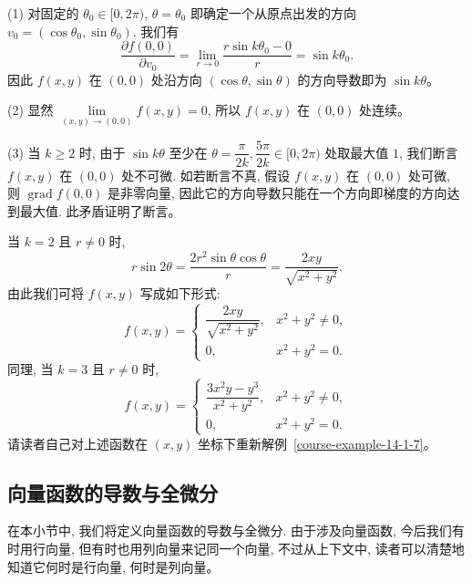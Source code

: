 \documentclass[12pt,fontset=fandol]{ctexart}
\begin{document}
\begin{solve}\quad (1) 对固定的 $\theta_0\in[0,2\pi)$, $\theta=\theta_0$ 即确定一个从原点出发的方向 $v_0=(\cos\theta_0,\sin\theta_0)$. 我们有
\[
  \frac{\partial f(0,0)}{\partial v_0}
  =\lim_{r\to0}\frac{r\sin k\theta_0-0}{r}
  =\sin k\theta_0.
\]
因此 $f(x,y)$ 在 $(0,0)$ 处沿方向 $(\cos\theta,\sin\theta)$ 的方向导数即为 $\sin k\theta$。

(2) 显然 $\lim\limits_{(x,y)\to(0,0)}f(x,y)=0$, 所以 $f(x,y)$ 在 $(0,0)$ 处连续。

(3) 当 $k\geqslant2$ 时, 由于 $\sin k\theta$ 至少在 $\theta=\dfrac{\pi}{2k}, \dfrac{5\pi}{2k}\in[0,2\pi)$ 处取最大值 $1$, 我们断言 $f(x,y)$ 在 $(0,0)$ 处不可微. 如若断言不真, 假设 $f(x,y)$ 在 $(0,0)$ 处可微, 则 $\operatorname{grad}f(0,0)$ 是非零向量, 因此它的方向导数只能在一个方向即梯度的方向达到最大值. 此矛盾证明了断言。

\end{solve}
\begin{remark}\quad 当 $k=2$ 且 $r\ne0$ 时,
\[
  r\sin2\theta=\frac{2r^2\sin\theta\cos\theta}{r}
  =\frac{2xy}{\sqrt{x^2+y^2}}.
\]
由此我们可将 $f(x,y)$ 写成如下形式:
\[
  f(x,y)=
  \begin{cases}
    \dfrac{2xy}{\sqrt{x^2+y^2}}, &x^2+y^2\ne0,\\
    0, &x^2+y^2=0.
  \end{cases}
\]
同理, 当 $k=3$ 且 $r\ne0$ 时,
\[
  f(x,y)=
  \begin{cases}
    \dfrac{3x^2y-y^3}{x^2+y^2}, &x^2+y^2\ne0,\\
    0, &x^2+y^2=0.
  \end{cases}
\]
请读者自己对上述函数在 $(x,y)$ 坐标下重新解例~\ref{course-example-14-1-7}。

\end{remark}
\subsection{向量函数的导数与全微分}

在本小节中, 我们将定义向量函数的导数与全微分. 由于涉及向量函数, 今后我们有时用行向量, 但有时也用列向量来记同一个向量, 不过从上下文中, 读者可以清楚地知道它何时是行向量, 何时是列向量。
\end{document}

